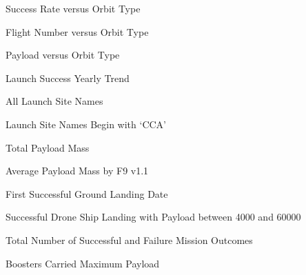 \begin{frame}{Success Rate versus Orbit Type}

\end{frame}

\begin{frame}{Flight Number versus Orbit Type}

\end{frame}

\begin{frame}{Payload versus Orbit Type}

\end{frame}

\begin{frame}{Launch Success Yearly Trend}

\end{frame}

\begin{frame}{All Launch Site Names}

\end{frame}

\begin{frame}{Launch Site Names Begin with `CCA'}

\end{frame}

\begin{frame}{Total Payload Mass}

\end{frame}

\begin{frame}{Average Payload Mass by F9 v1.1}

\end{frame}

\begin{frame}{First Successful Ground Landing Date}

\end{frame}

\begin{frame}{Successful Drone Ship Landing with Payload between 4000 and 60000}

\end{frame}

\begin{frame}{Total Number of Successful and Failure Mission Outcomes}

\end{frame}

\begin{frame}{Boosters Carried Maximum Payload}

\end{frame}

